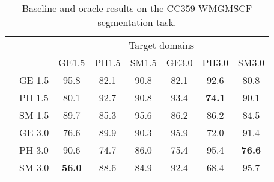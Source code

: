 

\begin{table}[h]
	\centering
	\caption{Baseline and oracle results on the CC359 WMGMSCF segmentation task.}
	\label{tab:wmgmcsf}
	
		\begin{tabular}{|c|l||c|c|c|c|c|c|}
			
			\hline
			\multicolumn{2}{|l||}{\multirow{2}{*}{}}  & \multicolumn{6}{c|}{Target domains}\\ 
			\cline{3-8}
			\multicolumn{2}{|l||}{} & GE1.5 & PH1.5 & SM1.5 & GE3.0 & PH3.0 & SM3.0\\ 
			\hline
			\hline
			
			
			\multirow{6}{*}{{\rotatebox[origin=c]{90}{Source domains}}}
			& GE 1.5 & 95.8 & 82.1 & 90.8 & 82.1 & 92.6 & 80.8 \\
			\cline{2-8}
			
			& PH 1.5 & 80.1 & 92.7 & 90.8 & 93.4 & \textbf{74.1} & 90.1 \\
			\cline{2-8}
			
			& SM 1.5 & 89.7 & 85.3 & 95.6 & 86.2 & 86.2 & 84.5 \\
			\cline{2-8}
			
			& GE 3.0 & 76.6 & 89.9 & 90.3 & 95.9 & 72.0 & 91.4 \\
			\cline{2-8}
			
			& PH 3.0 & 90.6 & 74.7 & 86.0 & 75.4 & 95.4 & \textbf{76.6} \\
			\cline{2-8}
			
			& SM 3.0 & \textbf{56.0} & 88.6 & 84.9 & 92.4 & 68.4 & 95.7 \\
			\hline
			
		\end{tabular}%
\end{table}


